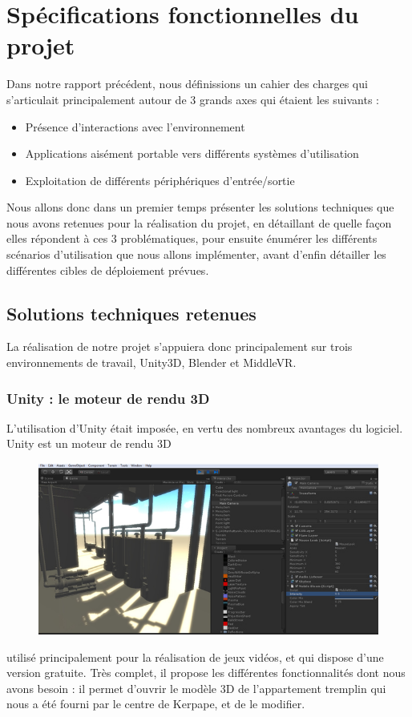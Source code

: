 \section{Spécifications fonctionnelles du projet}

Dans notre rapport précédent, nous définissions un cahier des charges qui s'articulait principalement autour de 3 grands axes qui étaient les suivants : 
\begin{itemize}\renewcommand{\labelitemi}{$\bullet$}
\item Présence d'interactions avec l'environnement
\item Applications aisément portable vers différents systèmes d'utilisation
\item Exploitation de différents périphériques d'entrée/sortie
\end{itemize}
Nous allons donc dans un premier temps présenter les solutions techniques que nous avons retenues pour la réalisation du projet, en détaillant de quelle façon elles répondent à ces 3 problématiques, pour ensuite énumérer les différents scénarios d'utilisation que nous allons implémenter, avant d'enfin détailler les différentes cibles de déploiement prévues. 

\subsection{Solutions techniques retenues}
La réalisation de notre projet s'appuiera donc principalement sur trois environnements de travail, Unity3D, Blender et MiddleVR. 

\subsubsection{Unity : le moteur de rendu 3D}
L'utilisation d'Unity était imposée, en vertu des nombreux avantages du logiciel. Unity est un moteur de rendu 3D 
\begin{figure}
	\centering
	\includegraphics[scale=0.5]{2-Specifications/img-utilisateur/screen_unity.jpg}
\end{figure}
utilisé principalement pour la réalisation de jeux vidéos, et qui dispose d'une version gratuite. Très complet, il propose les différentes fonctionnalités dont nous avons besoin : il permet d'ouvrir le modèle 3D de l'appartement tremplin qui nous a été fourni par le centre de Kerpape, et de le modifier. \newline

